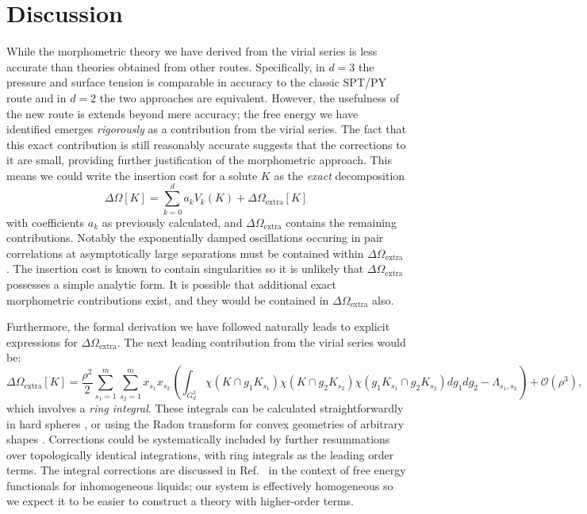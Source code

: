 \documentclass[11pt,twoside]{report}
\begin{document}
\section{Discussion}


While the morphometric theory we have derived from the virial series is less accurate than theories obtained from other routes. 
Specifically, in $d=3$ the pressure and surface tension is comparable in accuracy to the classic SPT/PY route and in $d=2$ the two approaches are equivalent.
However, the usefulness of the new route is extends beyond mere accuracy; the free energy we have identified emerges \emph{rigorously} as a contribution from the virial series.
The fact that this exact contribution is still reasonably accurate suggests that the corrections to it are small, providing further justification of the morphometric approach.
This means we could write the insertion cost for a solute $K$ as the \emph{exact} decomposition
\begin{equation}\label{eq:exact-morph-decomposition}
  \Delta \Omega[K]
  =
  \sum_{k=0}^d a_k V_k(K)
  + \Delta \Omega_\mathrm{extra}[K]
\end{equation}
with coefficients $a_k$ as previously calculated, and $\Delta \Omega_\mathrm{extra}$ contains the remaining contributions.
Notably the exponentially damped oscillations occuring in pair correlations at asymptotically large separations must be contained within $\Delta \Omega_\mathrm{extra}$.
The insertion cost is known to contain singularities \cite{ReissJCP1959} so it is unlikely that $\Delta \Omega_\mathrm{extra}$ possesses a simple analytic form.
It is possible that additional exact morphometric contributions exist, and they would be contained in $\Delta \Omega_\mathrm{extra}$ also.

Furthermore, the formal derivation we have followed naturally leads to explicit expressions for $\Delta \Omega_\mathrm{extra}$.
The next leading contribution from the virial series would be:
\begin{equation}
  \Delta \Omega_\mathrm{extra}[K]
  =
  \frac{\rho^2}{2}
  \sum_{s_1=1}^m \sum_{s_2=1}^m
  x_{s_1} x_{s_2}
  \left(
  \int_{G_d^2} \chi(K \cap g_1 K_{s_1}) \chi(K \cap g_2 K_{s_2}) \chi(g_1 K_{s_1} \cap g_2 K_{s_2}) dg_1 dg_2
  - \Lambda_{s_1,s_2} \right)
  + \mathcal{O}(\rho^3),
\end{equation}
which involves a \emph{ring integral}.
These integrals can be calculated straightforwardly in hard spheres \cite{MontrollJCP1941}, or using the Radon transform for convex geometries of arbitrary shapes \cite{WertheimMP1994,WertheimMP1996,WertheimMP1996a}.
Corrections could be systematically included by further resummations over topologically identical integrations, with ring integrals as the leading order terms.
The integral corrections are discussed in Ref.\ \cite{MarechalPRE2014} in the context of free energy functionals for inhomogeneous liquids; our system is effectively homogeneous so we expect it to be easier to construct a theory with higher-order terms.
\end{document}
